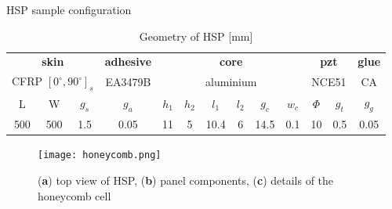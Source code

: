 \documentclass[10pt]{beamer} %
\begin{document}
	\begin{frame}[label=frame6]{HSP sample configuration}

		\begin{table}

			\centering \footnotesize

			\caption{Geometry of HSP [mm]}


			\begin{tabular}{ccccccccccccc} 


				\toprule

				\multicolumn{3}{c}{\textbf{skin}} & {\textbf{adhesive}} & \multicolumn{6}{c}{\textbf{core}} & \multicolumn{2}{c}{\textbf{pzt}} & {\textbf{glue}}\\

				\multicolumn{3}{c}{CFRP $[0^\circ,90^\circ]_s$} & {EA3479B} & \multicolumn{6}{c}{aluminium} & \multicolumn{2}{c}{NCE51} & {CA}\\ 


				\cmidrule(lr){1-3} \cmidrule(lr){4-4} \cmidrule(lr){5-10} \cmidrule(lr){11-12} \cmidrule(lr){13-13}

				L & W & $g_s$ & $g_a$ & $h_1$ & $h_2$ & $l_1$ & $l_2$ & $g_c$ & $w_c$ & $\Phi$ & $g_t$ & $g_g$\\ 



				\cmidrule(lr){1-3} \cmidrule(lr){4-4} \cmidrule(lr){5-10} \cmidrule(lr){11-12} \cmidrule(lr){13-13}

				500 & 500 & 1.5 & 0.05 & 11 & 5 & 10.4 & 6 & 14.5 & 0.1 & 10 & 0.5 & 0.05\\


				\bottomrule 

			\end{tabular} 

			\label{tab:panel_geo}

		\end{table}

		\begin{figure}

			\texttt{[image: honeycomb.png]}

			\caption{(\textbf{a}) top view of HSP, (\textbf{b}) panel components, (\textbf{c}) details of the honeycomb cell}

		\end{figure}

	\end{frame}
\end{document}
